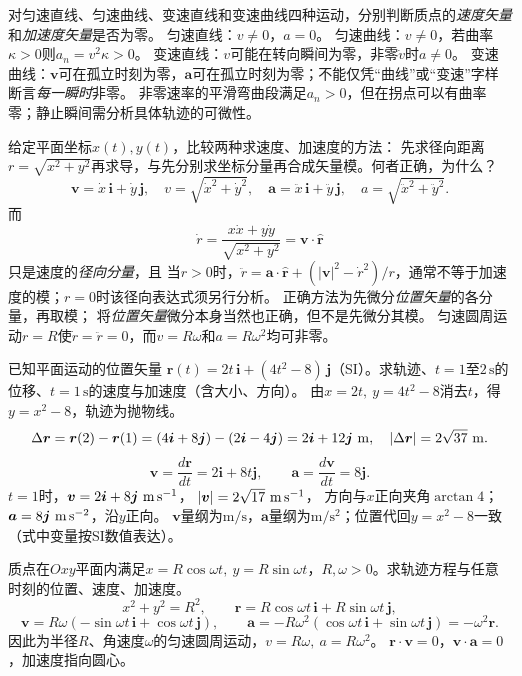 \problemtext 对匀速直线、匀速曲线、变速直线和变速曲线四种运动，分别判断质点的\emph{速度矢量}和\emph{加速度矢量}是否为零。
\workings
匀速直线：$v\ne0$，$a=0$。
匀速曲线：$v\ne0$，若曲率$\kappa>0$则$a_n=v^2\kappa>0$。
变速直线：$v$可能在转向瞬间为零，非零$\dot v$时$a\ne0$。
变速曲线：$\bm v$可在孤立时刻为零，$\bm a$可在孤立时刻为零；不能仅凭“曲线”或“变速”字样断言\emph{每一瞬时}非零。
\crosscheck 非零速率的平滑弯曲段满足$a_n>0$，但在拐点可以有曲率零；静止瞬间需分析具体轨迹的可微性。

\problemtext 给定平面坐标$x(t),y(t)$，比较两种求速度、加速度的方法：
先求径向距离$r=\sqrt{x^2+y^2}$再求导，与先分别求坐标分量再合成矢量模。何者正确，为什么？
\workings
\[
\bm v=\dot x\,\bm i+\dot y\,\bm j,\quad
v=\sqrt{\dot x^2+\dot y^2},\quad
\bm a=\ddot x\,\bm i+\ddot y\,\bm j,\quad
a=\sqrt{\ddot x^2+\ddot y^2}.
\]
而
\[
\dot r=\frac{x\dot x+y\dot y}{\sqrt{x^2+y^2}}
=\bm v\cdot\hat{\bm r}
\]
只是速度的\emph{径向分量}，且
当$r>0$时，$\ddot r=\bm a\cdot\hat{\bm r}+(|\bm v|^2-\dot r^2)/r$，通常不等于加速度的模；$r=0$时该径向表达式须另行分析。
正确方法为先微分\emph{位置矢量}的各分量，再取模；
将\emph{位置矢量}微分本身当然也正确，但不是先微分其模。
\crosscheck 匀速圆周运动$r=R$使$\dot r=\ddot r=0$，而$v=R\omega$和$a=R\omega^2$均可非零。


\problemtext 已知平面运动的位置矢量
$\bm r(t)=2t\,\bm i+(4t^2-8)\,\bm j$（SI）。求轨迹、$t=1$至$2\,\mathrm s$的位移、$t=1\,\mathrm s$的速度与加速度（含大小、方向）。
\workings
由$x=2t,\ y=4t^2-8$消去$t$，得$y=x^2-8$，轨迹为抛物线。
\[
\Delta\bm r=\bm r(2)-\bm r(1)=(4\bm i+8\bm j)-(2\bm i-4\bm j)
=2\bm i+12\bm j\ {\rm m},\quad |\Delta\bm r|=2\sqrt{37}\ {\rm m}.
\]
\[
\bm v=\frac{d\bm r}{dt}=2\bm i+8t\bm j,\qquad
\bm a=\frac{d\bm v}{dt}=8\bm j.
\]
$t=1$时，$\bm v=2\bm i+8\bm j\ {\rm m\,s^{-1}}$，
$|\bm v|=2\sqrt{17}\ {\rm m\,s^{-1}}$，
方向与$x$正向夹角$\arctan4$；$\bm a=8\bm j\ {\rm m\,s^{-2}}$，沿$y$正向。
\crosscheck $\bm v$量纲为$\mathrm{m/s}$，$\bm a$量纲为$\mathrm{m/s^2}$；位置代回$y=x^2-8$一致（式中变量按SI数值表达）。

\problemtext 质点在$Oxy$平面内满足$x=R\cos\omega t,\ y=R\sin\omega t$，$R,\omega>0$。求轨迹方程与任意时刻的位置、速度、加速度。
\workings
\[
x^2+y^2=R^2,\qquad
\bm r=R\cos\omega t\,\bm i+R\sin\omega t\,\bm j,
\]
\[
\bm v=R\omega(-\sin\omega t\,\bm i+\cos\omega t\,\bm j),
\qquad
\bm a=-R\omega^2(\cos\omega t\,\bm i+\sin\omega t\,\bm j)
=-\omega^2\bm r.
\]
因此为半径$R$、角速度$\omega$的匀速圆周运动，$v=R\omega,\ a=R\omega^2$。
\crosscheck $\bm r\cdot\bm v=0$，$\bm v\cdot\bm a=0$，加速度指向圆心。

